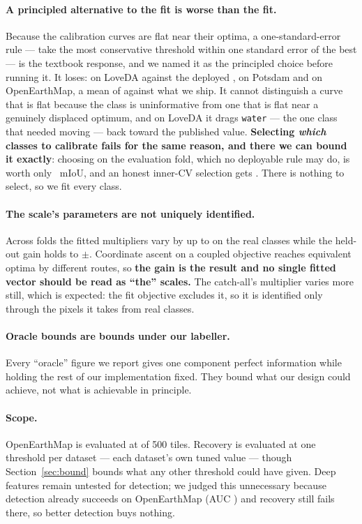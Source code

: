 \documentclass[10pt,a4paper]{article}                        %
\newcommand{\best}[1]{\textbf{#1}}
\begin{document}
\paragraph{A principled alternative to the fit is worse than the fit.} Because the
calibration curves are flat near their optima, a one-standard-error rule --- take
the most conservative threshold within one standard error of the best --- is the
textbook response, and we named it as the principled choice before running it. It
loses: \seLove{} on LoveDA against the deployed \methodGain{}, \sePots{} on
Potsdam and \seOEM{} on OpenEarthMap, a mean of \seMean{} against what we ship. It
cannot distinguish a curve that is flat because the class is uninformative from
one that is flat near a genuinely displaced optimum, and on LoveDA it drags
\texttt{water} --- the one class that needed moving --- back toward the published
value. \best{Selecting \emph{which} classes to calibrate fails for the same reason,
and there we can bound it exactly}: choosing on the evaluation fold, which no
deployable rule may do, is worth only \frzOracle{}~mIoU, and an honest inner-CV
selection gets \frzCv{}. There is nothing to select, so we fit every class.

\paragraph{The scale's parameters are not uniquely identified.} Across folds the
fitted multipliers vary by up to \scSpread{} on the real classes while the held-out
gain holds to $\pm$\scPotsSD{}. Coordinate ascent on a coupled objective reaches
equivalent optima by different routes, so \best{the gain is the result and no single
fitted vector should be read as ``the'' scales.} The catch-all's multiplier varies
more still, which is expected: the fit objective excludes it, so it is identified
only through the pixels it takes from real classes.

\paragraph{Oracle bounds are bounds under our labeller.} Every ``oracle'' figure
we report gives one component perfect information while holding the rest of our
implementation fixed. They bound what our design could achieve, not what is
achievable in principle.

\paragraph{Scope.} OpenEarthMap is evaluated at \oemTiles{} of 500 tiles.
Recovery is evaluated at one threshold per dataset --- each dataset's own tuned
value --- though Section~\ref{sec:bound} bounds what any other threshold could
have given. Deep features remain untested for detection; we judged this
unnecessary because detection already succeeds on OpenEarthMap (AUC \aucOEM{})
and recovery still fails there, so better detection buys nothing.
\end{document}
